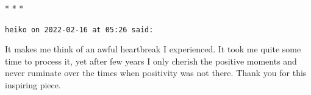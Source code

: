 \begin{center}* * *\end{center}

\begin{footnotesize}
\begin{sffamily}
\texttt{heiko on 2022-02-16 at 05:26 said:}

It makes me think of an awful heartbreak I experienced. It took me quite some time to process it, yet after few years I only cherish the positive moments and never ruminate over the times when positivity was not there. Thank you for this inspiring piece.

\end{sffamily}
\end{footnotesize}

